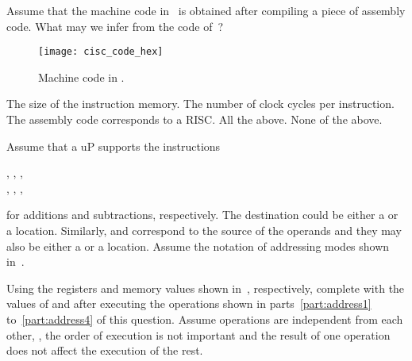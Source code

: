 \documentclass[number=1]{examfancy}
\begin{document}
\begin{questions}
\newpage
\question[4] Assume that the machine code in~ is obtained after compiling a piece of assembly code. What may we infer from the code of~?
\begin{figure}[!ht]
\centering
\texttt{[image: cisc\_code\_hex]}
\caption{Machine code in .}
\label{figure:cisc_code_hex}
\end{figure}
\begin{choices}
\choice The size of the instruction memory.
\choice The number of clock cycles per instruction.
\choice The assembly code corresponds to a \acs{RISC}.
\choice All the above.
\CorrectChoice None of the above.
\end{choices}

\newpage
\question[20] Assume that a \acs{uP} supports the instructions
\begin{center} 
, , ,  \\
, , , 
\end{center}
for additions and subtractions, respectively.
The destination  could be either a  or a  location. 
Similarly,  and  correspond to the source of the operands and they may also be either a  or a  location.
Assume the notation of addressing modes shown in~.

Using the registers and memory values shown in~, respectively, complete  with the values of  and  after executing the operations shown in parts~\ref{part:address1} to~\ref{part:address4} of this question. 
Assume operations are independent from each other, \ie, the order of execution is not important and the result of one operation does not affect the execution of the rest.




\end{questions}
\end{document}
